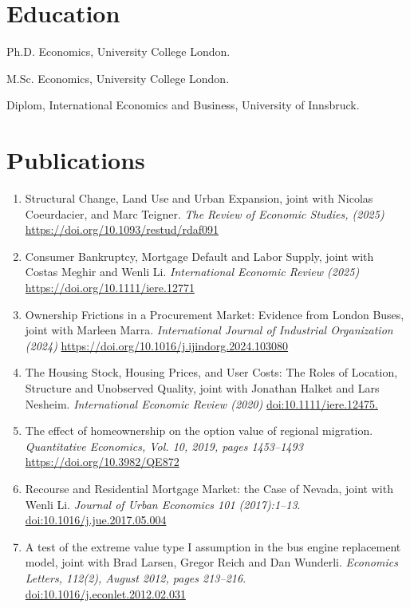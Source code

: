 \documentclass[letterpaper]{article}
\renewenvironment{itemize}{
  \begin{list}{}{
    \setlength{\leftmargin}{1.5em}
  }
}{
  \end{list}
}
\begin{document}
\section*{Education}

\begin{itemize}
  \setlength{\itemindent}{26pt}
  \item[2015:] Ph.D. Economics, University College London.
   
  \item[2008:] M.Sc. Economics, University College London.

  \item[2006:] Diplom, International Economics and Business, University of Innsbruck.

\end{itemize}


\section*{Publications}

\begin{enumerate}
\item Structural Change, Land Use and Urban Expansion, joint with Nicolas Coeurdacier, and Marc Teigner. {\it The Review of Economic Studies, (2025)} \url{https://doi.org/10.1093/restud/rdaf091}
\item Consumer Bankruptcy, Mortgage Default and Labor Supply, joint with Costas Meghir and Wenli Li. {\it International Economic Review (2025)} \url{https://doi.org/10.1111/iere.12771}
\item Ownership Frictions in a Procurement Market: Evidence from London Buses, joint with Marleen Marra. {\it International Journal of Industrial Organization (2024)} \url{https://doi.org/10.1016/j.ijindorg.2024.103080}
\item The Housing Stock, Housing Prices, and User Costs: The Roles of Location, Structure and Unobserved Quality, joint with Jonathan Halket and Lars Nesheim. {\it International Economic Review (2020)} \url{doi:10.1111/iere.12475.}
\item The effect of homeownership on the option value of regional migration. {\it Quantitative Economics, Vol. 10, 2019, pages 1453--1493} \url{https://doi.org/10.3982/QE872}
\item Recourse and Residential Mortgage Market: the Case of Nevada, joint with Wenli Li. {\it Journal of Urban Economics 101 (2017):1–13}. \url{doi:10.1016/j.jue.2017.05.004}
\item A test of the extreme value type I assumption in the bus engine replacement model, joint with Brad Larsen, Gregor Reich and Dan Wunderli. {\it Economics Letters, 112(2), August 2012, pages 213--216}. \url{doi:10.1016/j.econlet.2012.02.031}





\end{enumerate}
\end{document}
